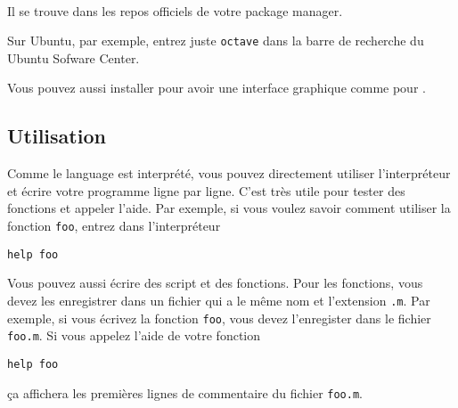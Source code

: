 \paragraph{\octave{}}
Il se trouve dans les repos officiels de votre package manager.

Sur Ubuntu, par exemple, entrez juste \verb|octave| dans la barre de
recherche du Ubuntu Sofware Center.

Vous pouvez aussi installer \qtoctave{} pour avoir une interface graphique
comme pour \matlab.

\subsection{Utilisation}
Comme le language est interprété, vous pouvez directement
utiliser l'interpréteur et écrire votre programme ligne par ligne.
C'est très utile pour tester des fonctions et appeler l'aide.
Par exemple, si vous voulez savoir comment utiliser la fonction
\lstinline|foo|, entrez dans l'interpréteur
\begin{lstlisting}
help foo
\end{lstlisting}

Vous pouvez aussi écrire des script et des fonctions.
Pour les fonctions, vous devez les enregistrer dans un fichier
qui a le même nom et l'extension \verb|.m|.
Par exemple, si vous écrivez la fonction \lstinline|foo|, vous devez
l'enregister dans le fichier \verb|foo.m|.
Si vous appelez l'aide de votre fonction
\begin{lstlisting}
help foo
\end{lstlisting}
ça affichera les premières lignes de commentaire du fichier \verb|foo.m|.


